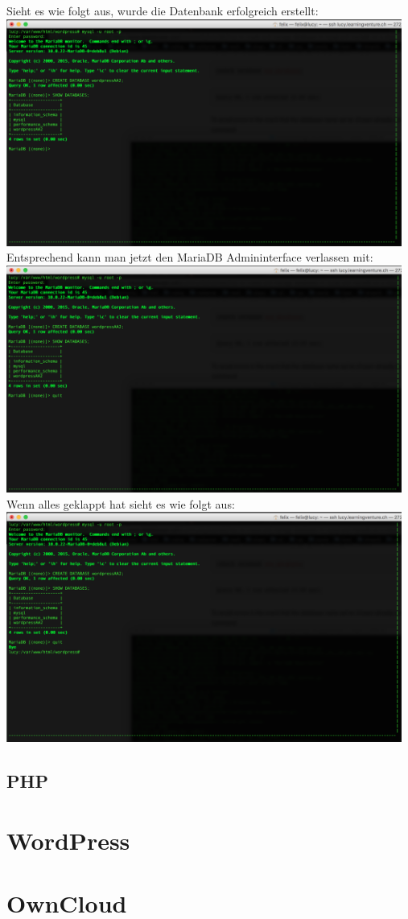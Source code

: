 \documentclass{article}
\begin{document}
	\newline
	Sieht es wie folgt aus, wurde die Datenbank erfolgreich erstellt:
	\newline
	\includegraphics[width=13cm]{../Pics/25-maria-db-show-success}
	\newline
	Entsprechend kann man jetzt den MariaDB Admininterface verlassen mit:
	\newline
	\includegraphics[width=13cm]{../Pics/26-maria-db-quit}
	\newline
	Wenn alles geklappt hat sieht es wie folgt aus:
	\newline
	\includegraphics[width=13cm]{../Pics/27-maria-db-quit-success}
	\newline
	
	\subsection{PHP}
	\section{WordPress}
	\section{OwnCloud}
\end{document}

